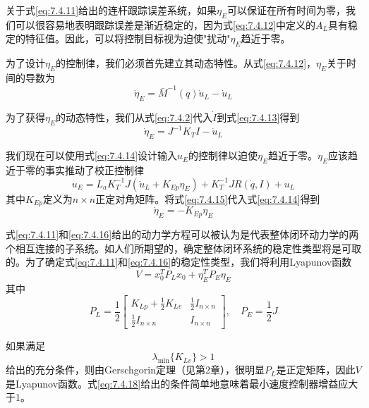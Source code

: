 \documentclass[UTF8]{ctexart}
\begin{document}
关于式\eqref{eq:7.4.11}给出的连杆跟踪误差系统，如果$\eta_E$可以保证在所有时间为零，我们可以很容易地表明跟踪误差是渐近稳定的，因为式\eqref{eq:7.4.12}中定义的$A_L$具有稳定的特征值。因此，可以将控制目标视为迫使"扰动"$\eta_E$趋近于零。

为了设计$\eta_E$的控制律，我们必须首先建立其动态特性。从式\eqref{eq:7.4.12}，$\eta_E$关于时间的导数为
\begin{equation}\label{eq:7.4.13}
\dot{\eta}_E = \bar{M}^{-1}(q)\dot{u}_L - \dot{u}_L
\end{equation}

为了获得$\eta_E$的动态特性，我们从式\eqref{eq:7.4.2}代入$\dot{I}$到式\eqref{eq:7.4.13}得到
\begin{equation}\label{eq:7.4.14}
\dot{\eta}_E = J^{-1}K_T I - \dot{u}_L
\end{equation}

我们现在可以使用式\eqref{eq:7.4.14}设计输入$u_E$的控制律以迫使$\eta_E$趋近于零。$\eta_E$应该趋近于零的事实推动了校正控制律
\begin{equation}\label{eq:7.4.15}
u_E = L_a K_T^{-1}J(\ddot{u}_L + K_{Ep}\eta_E) + K_T^{-1}JR(\dot{q},I) + u_L
\end{equation}
其中$K_{Ep}$定义为$n \times n$正定对角矩阵。将式\eqref{eq:7.4.15}代入式\eqref{eq:7.4.14}得到
\begin{equation}\label{eq:7.4.16}
\dot{\eta}_E = -K_{Ep}\eta_E
\end{equation}

式\eqref{eq:7.4.11}和\eqref{eq:7.4.16}给出的动力学方程可以被认为是代表整体闭环动力学的两个相互连接的子系统。如人们所期望的，确定整体闭环系统的稳定性类型将是可取的。为了确定式\eqref{eq:7.4.11}和\eqref{eq:7.4.16}的稳定性类型，我们将利用Lyapunov函数
\begin{equation}\label{eq:7.4.17}
V = x_0^T P_L x_0 + \eta_E^T P_E \eta_E
\end{equation}
其中
\begin{equation*}
P_L = \frac{1}{2}\begin{bmatrix} K_{Lp} + \frac{1}{2}K_{Lv} & \frac{1}{2}I_{n \times n} \\ \frac{1}{2}I_{n \times n} & I_{n \times n} \end{bmatrix}, \quad P_E = \frac{1}{2}J
\end{equation*}

如果满足
\begin{equation}\label{eq:7.4.18}
\lambda_{\min}\{K_{Lv}\} > 1
\end{equation}
给出的充分条件，则由Gerschgorin定理（见第2章），很明显$P_L$是正定矩阵，因此$V$是Lyapunov函数。式\eqref{eq:7.4.18}给出的条件简单地意味着最小速度控制器增益应大于1。
\end{document}
